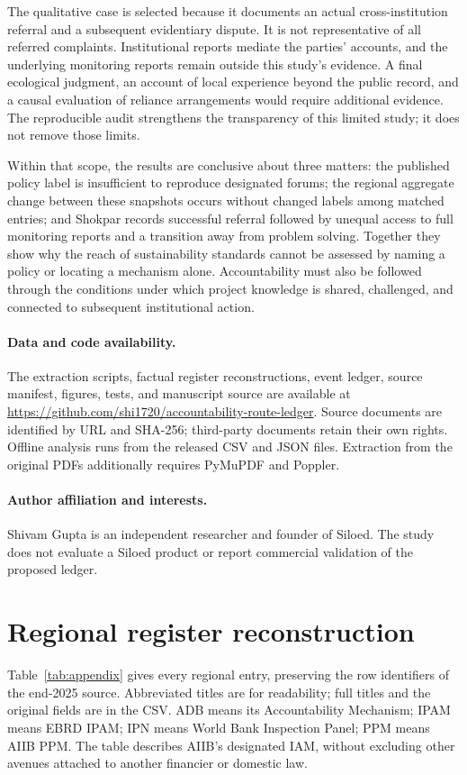 \documentclass[11pt,a4paper]{article}
\begin{document}
The qualitative case is selected because it documents an actual cross-institution referral and a subsequent evidentiary dispute. It is not representative of all referred complaints. Institutional reports mediate the parties' accounts, and the underlying monitoring reports remain outside this study's evidence. A final ecological judgment, an account of local experience beyond the public record, and a causal evaluation of reliance arrangements would require additional evidence. The reproducible audit strengthens the transparency of this limited study; it does not remove those limits.

Within that scope, the results are conclusive about three matters: the published policy label is insufficient to reproduce designated forums; the regional aggregate change between these snapshots occurs without changed labels among matched entries; and Shokpar records successful referral followed by unequal access to full monitoring reports and a transition away from problem solving. Together they show why the reach of sustainability standards cannot be assessed by naming a policy or locating a mechanism alone. Accountability must also be followed through the conditions under which project knowledge is shared, challenged, and connected to subsequent institutional action.

\paragraph{Data and code availability.} The extraction scripts, factual register reconstructions, event ledger, source manifest, figures, tests, and manuscript source are available at \url{https://github.com/shi1720/accountability-route-ledger}. Source documents are identified by URL and SHA-256; third-party documents retain their own rights. Offline analysis runs from the released CSV and JSON files. Extraction from the original PDFs additionally requires PyMuPDF and Poppler.

\paragraph{Author affiliation and interests.} Shivam Gupta is an independent researcher and founder of Siloed. The study does not evaluate a Siloed product or report commercial validation of the proposed ledger.




\appendix
\section{Regional register reconstruction}
Table~\ref{tab:appendix} gives every regional entry, preserving the row identifiers of the end-2025 source. Abbreviated titles are for readability; full titles and the original fields are in the CSV. ADB means its Accountability Mechanism; IPAM means EBRD IPAM; IPN means World Bank Inspection Panel; PPM means AIIB PPM. The table describes AIIB's designated IAM, without excluding other avenues attached to another financier or domestic law.
\end{document}
